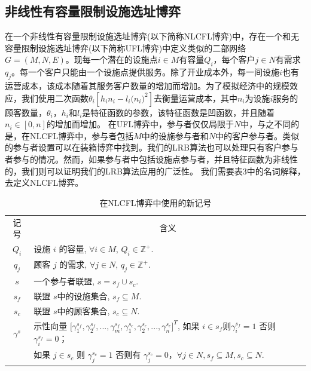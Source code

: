\documentclass[UTF8]{article}
\newcommand{\Z}{\mathbb{Z}}
\begin{document}
\begin{定义}
    \subsection{非线性有容量限制设施选址博弈}\label{section:NLCFL}
    在一个非线性有容量限制设施选址博弈(以下简称NLCFL博弈)中，存在一个和无容量限制设施选址博弈(以下简称UFL博弈)中定义类似的二部网络$G=(M,N,E)$。现每一个潜在的设施点$i \in M$有容量$Q_i$，每个客户$j \in N$有需求$q_j$。每一个客户只能由一个设施点提供服务。除了开业成本外，每一间设施$i$也有运营成本，该成本随着其服务客户数量的增加而增加。为了模拟经济中的规模效应，我们使用二次函数$\theta_i[h_i n_i - l_i\big(n_i \big)^2]$去衡量运营成本，其中$n_i$为设施$i$服务的顾客数量，$\theta_i$，$h_i$和$l_i$是特征函数的参数，该特征函数是凹函数，并且随着$n_i \in [0,n]$的增加而增加。
    在UFL博弈中，参与者仅仅局限于$N$中，与之不同的是，在NLCFL博弈中，参与者包括$M$中的设施参与者和$N$中的客户参与者。类似的参与者设置可以在装箱博弈中找到。我们的LRB算法也可以处理只有客户参与者参与的情况。然而，如果参与者中包括设施点参与者，并且特征函数为非线性的，我们则可以证明我们的LRB算法应用的广泛性。
    我们需要表3中的名词解释，去定义NLCFL博弈。
    \begin{table}[H]
    \vspace{-2mm}
    \centering
    \tabcolsep=7pt
    \small
    \renewcommand\arraystretch{1.5}
    \caption{\label{table:notations} 在NLCFL博弈中使用的新记号}
    \begin{tabular}[!h]{c c}
    \hline
    \multicolumn{1}{c}{记号} &\multicolumn{1}{c}{含义}\\
    \cline{1-2}
    \multicolumn{1}{c}{$Q_i$} &\multicolumn{1}{l}{设施 $i$ 的容量, $\forall i \in M$, $Q_i \in \Z^+$.}\\
    \multicolumn{1}{c}{$q_j$} &\multicolumn{1}{l}{顾客 $j$ 的需求, $\forall j \in N$, $q_j \in \Z^+$.}\\
    \multicolumn{1}{c}{$s$} &\multicolumn{1}{l}{一个参与者联盟, $s = s_f \cup s_c$.}\\
    \multicolumn{1}{c}{$s_f$} &\multicolumn{1}{l}{联盟 $s$中的设施集合, $s_f \subseteq M$.}\\
    \multicolumn{1}{c}{$s_c$} &\multicolumn{1}{l}{联盟 $s$中的顾客集合, $s_c \subseteq N$.}\\
    \multicolumn{1}{c}{$\gamma^s$} &\multicolumn{1}{l}{示性向量 $\big[ \gamma^{s_f}_1,\gamma^{s_f}_2,...,\gamma^{s_f}_{m},\gamma^{s_c}_{1},\gamma^{s_c}_{2},...,\gamma^{s_c}_{n} \big]^T$, 如果 $i \in s_f$则$\gamma^{s_f}_i=1$ 否则 $\gamma^{s_f}_i=0$； }\\
    \multicolumn{1}{c}{} &\multicolumn{1}{l}{ 如果 $j \in s_c$ 则 $\gamma^{s_c}_j=1$ 否则有 $\gamma^{s_c}_j=0$，$\forall j \in N, s_f \subseteq M, s_c \subseteq N$.}\\

\end{tabular}
\end{table}
\end{定义}
\end{document}
